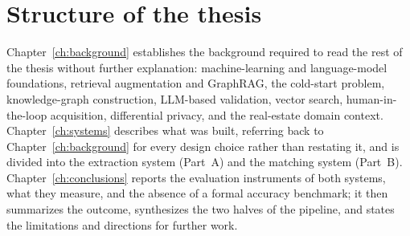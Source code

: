 \section{Structure of the thesis}
\label{sec:intro-structure}

Chapter~\ref{ch:background} establishes the background required to read the rest of the thesis without further explanation: machine-learning and language-model foundations, retrieval augmentation and GraphRAG, the cold-start problem, knowledge-graph construction, LLM-based validation, vector search, human-in-the-loop acquisition, differential privacy, and the real-estate domain context. Chapter~\ref{ch:systems} describes what was built, referring back to Chapter~\ref{ch:background} for every design choice rather than restating it, and is divided into the extraction system (Part~A) and the matching system (Part~B). Chapter~\ref{ch:conclusions} reports the evaluation instruments of both systems, what they measure, and the absence of a formal accuracy benchmark; it then summarizes the outcome, synthesizes the two halves of the pipeline, and states the limitations and directions for further work.
